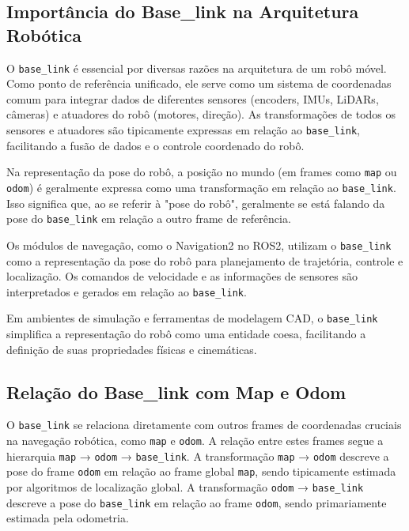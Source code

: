 \subsection{Importância do Base\_link na Arquitetura Robótica}

O \texttt{base\_link} é essencial por diversas razões na arquitetura de um robô
móvel. Como ponto de referência unificado, ele serve como um sistema de
coordenadas comum para integrar dados de diferentes sensores (encoders, IMUs,
LiDARs, câmeras) e atuadores do robô (motores, direção). As transformações de
todos os sensores e atuadores são tipicamente expressas em relação ao
\texttt{base\_link}, facilitando a fusão de dados e o controle coordenado do
robô.

Na representação da pose do robô, a posição no mundo (em frames como
\texttt{map} ou \texttt{odom}) é geralmente expressa como uma transformação em
relação ao \texttt{base\_link}. Isso significa que, ao se referir à "pose do
robô", geralmente se está falando da pose do \texttt{base\_link} em relação a
outro frame de referência.

Os módulos de navegação, como o Navigation2 no ROS2, utilizam o
\texttt{base\_link} como a representação da pose do robô para planejamento de
trajetória, controle e localização. Os comandos de velocidade e as informações
de sensores são interpretados e gerados em relação ao \texttt{base\_link}.

Em ambientes de simulação e ferramentas de modelagem CAD, o \texttt{base\_link}
simplifica a representação do robô como uma entidade coesa, facilitando a
definição de suas propriedades físicas e cinemáticas.

\subsection{Relação do Base\_link com Map e Odom}

O \texttt{base\_link} se relaciona diretamente com outros frames de coordenadas
cruciais na navegação robótica, como \texttt{map} e \texttt{odom}. A relação
entre estes frames segue a hierarquia \texttt{map} → \texttt{odom} →
\texttt{base\_link}. A transformação \texttt{map} → \texttt{odom} descreve a
pose do frame \texttt{odom} em relação ao frame global \texttt{map}, sendo
tipicamente estimada por algoritmos de localização global. A transformação
\texttt{odom} → \texttt{base\_link} descreve a pose do \texttt{base\_link} em
relação ao frame \texttt{odom}, sendo primariamente estimada pela odometria.


